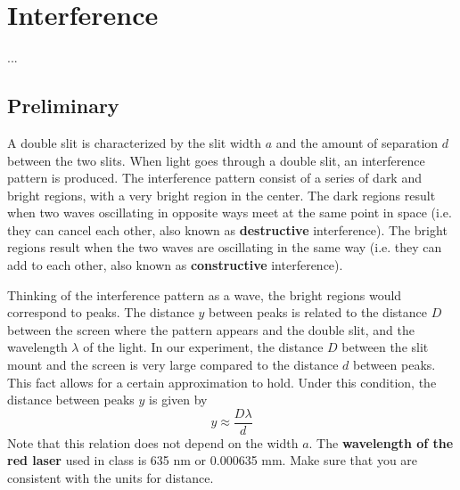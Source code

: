 \chapter{Interference}
...
\section{Preliminary}
A double slit is characterized by the slit width $a$ and the amount of separation $d$ between the two slits. When light goes through a double slit, an interference pattern is produced. The interference pattern consist of a series of dark and bright regions, with a very bright region in the center. The dark regions result when two waves oscillating in opposite ways meet at the same point in space (i.e. they can cancel each other, also known as \textbf{destructive} interference). The bright regions result when the two waves are oscillating in the same way (i.e. they can add to each other, also known as \textbf{constructive} interference).

Thinking of the interference pattern as a wave, the bright regions would correspond to peaks. The distance $y$ between peaks is related to the distance $D$ between the screen where the pattern appears and the double slit, and the wavelength $\lambda$ of the light. In our experiment, the distance $D$ between the slit mount and the screen is very large compared to the distance $d$ between peaks. This fact allows for a certain approximation to hold. Under this condition, the distance between peaks $y$ is given by
\begin{equation} \label{y.eq}
	y \approx \frac{D \lambda}{d}
\end{equation}
Note that this relation does not depend on the width $a$. The \textbf{wavelength of the red laser} used in class is 635 nm or 0.000635 mm. Make sure that you are consistent with the units for distance.

